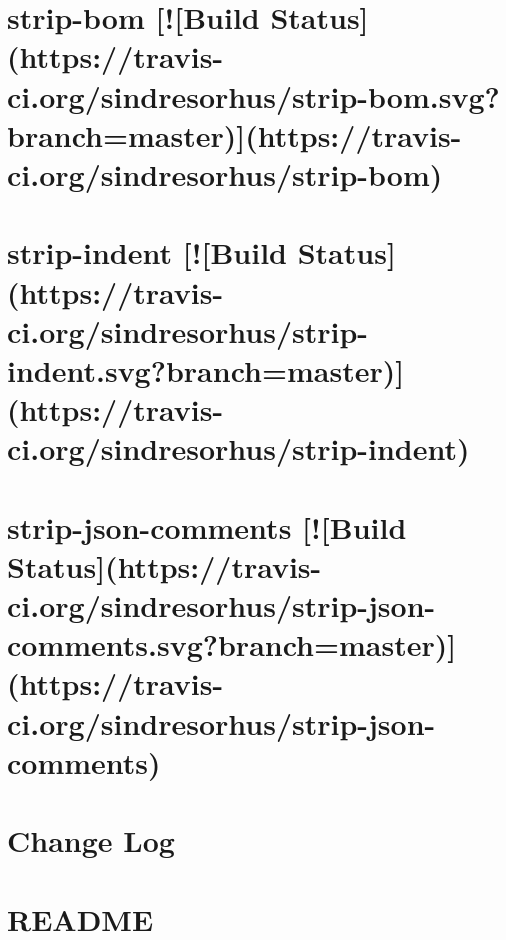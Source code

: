 \documentclass[twoside]{book}
\newcommand{\+}{\discretionary{\mbox{\scriptsize$\hookleftarrow$}}{}{}}
\begin{document}
\chapter{strip-\/bom \mbox{[}!\mbox{[}Build Status\mbox{]}(https\+://travis-\/ci.org/sindresorhus/strip-\/bom.svg?branch=master)\mbox{]}(https\+://travis-\/ci.org/sindresorhus/strip-\/bom)}
\label{md__c_1_workspace_demo_src_main_script_node_modules_strip-bom_readme}

\chapter{strip-\/indent \mbox{[}!\mbox{[}Build Status\mbox{]}(https\+://travis-\/ci.org/sindresorhus/strip-\/indent.svg?branch=master)\mbox{]}(https\+://travis-\/ci.org/sindresorhus/strip-\/indent)}
\label{md__c_1_workspace_demo_src_main_script_node_modules_strip-indent_readme}

\chapter{strip-\/json-\/comments \mbox{[}!\mbox{[}Build Status\mbox{]}(https\+://travis-\/ci.org/sindresorhus/strip-\/json-\/comments.svg?branch=master)\mbox{]}(https\+://travis-\/ci.org/sindresorhus/strip-\/json-\/comments)}
\label{md__c_1_workspace_demo_src_main_script_node_modules_strip-json-comments_readme}

\chapter{Change Log}
\label{md__c_1_workspace_demo_src_main_script_node_modules_style-loader__c_h_a_n_g_e_l_o_g}

\chapter{R\+E\+A\+D\+ME}
\label{md__c_1_workspace_demo_src_main_script_node_modules_style-loader__r_e_a_d_m_e}

\end{document}
